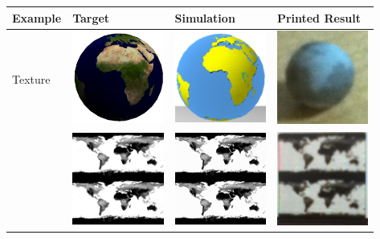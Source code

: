 \documentclass[annual]{acmsiggraph}
\begin{document}
\begin{table}
\centering
\begin{tabular}{|p{2cm}|l|l|l|}
\hline 
\textbf{Example} & \textbf{Target} & \textbf{Simulation} & \textbf{Printed Result}\\
\hline 
Texture&  \includegraphics[width=3cm]{figure/globeTarget.png}& \includegraphics[width=3cm]{figure/globeSim.png}
& \includegraphics[width=3cm]{figure/globe.png}\\
&  \includegraphics[width=3cm]{figure/mapTarget.png}& \includegraphics[width=3cm]{figure/mapSim.png}
& \includegraphics[width=3cm]{figure/map.png}\\

\end{tabular}
\end{table}
\end{document}
